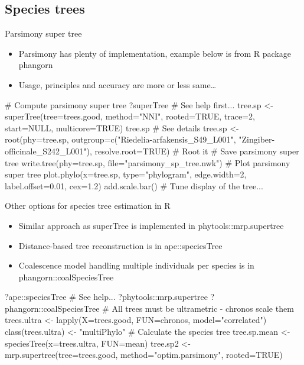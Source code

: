 \documentclass[compress, ucs, xelatex, 11pt, xcolor=x11names, aspectratio=169,
	hyperref={
		bookmarks=true,
		unicode=true,
		colorlinks=true,
		pdftitle={HybSeq course},
		plainpages=false,
		pdfauthor={Vojtech Zeisek},
		pdfsubject={Practical processing of HybSeq target enrichment sequencing data on computing grids like MetaCentrum},
		pdfcreator={XeLaTeX},
		pdfkeywords={BASH, command line, GNU, HybSeq, Linux, MetaCentrum, sequencing shell, target enrichment},
		linkcolor=Turquoise4, %
		anchorcolor=DodgerBlue4, %
		citecolor=DodgerBlue4, %
		filecolor=DodgerBlue4, %
		menucolor=Tan4, %
		urlcolor=DarkOliveGreen4, %
		pdftex},
	url={hyphens, lowtilde} %
	]{beamer}
\renewcommand{\texttt}[1]{\colorbox{Cornsilk2}{{\ttfamily #1}}}
\begin{document}
\subsection{Species trees}

\begin{frame}[fragile]{Parsimony super tree}
	\begin{itemize}
		\item Parsimony has plenty of implementation, example below is from \texttt{R} package \texttt{phangorn}
		\item Usage, principles and accuracy are more or less same\ldots
	\end{itemize}
	\begin{spluscode}
    # Compute parsimony super tree
    ?superTree # See help first...
    tree.sp <- superTree(tree=trees.good, method="NNI", rooted=TRUE,
      trace=2, start=NULL, multicore=TRUE)
    tree.sp # See details
    tree.sp <- root(phy=tree.sp, outgroup=c("Riedelia-arfakensis_S49_L001",
      "Zingiber-officinale_S242_L001"), resolve.root=TRUE) # Root it
    # Save parsimony super tree
    write.tree(phy=tree.sp, file="parsimony_sp_tree.nwk")
    # Plot parsimony super tree
    plot.phylo(x=tree.sp, type="phylogram", edge.width=2,
      label.offset=0.01, cex=1.2)
    add.scale.bar()
    # Tune display of the tree...
	\end{spluscode}
\end{frame}

\begin{frame}[fragile]{Other options for species tree estimation in R}
	\begin{itemize}
		\item Similar approach as \texttt{superTree} is implemented in \texttt{phytools::mrp.supertree}
		\item Distance-based tree reconstruction is in \texttt{ape::speciesTree}
		\item Coalescence model handling multiple individuals per species is in \texttt{phangorn::coalSpeciesTree}
	\end{itemize}
	\begin{spluscode}
    ?ape::speciesTree # See help...
    ?phytools::mrp.supertree
    ?phangorn::coalSpeciesTree
    # All trees must be ultrametric - chronos scale them
    trees.ultra <- lapply(X=trees.good, FUN=chronos, model="correlated")
    class(trees.ultra) <- "multiPhylo"
    # Calculate the species tree
    tree.sp.mean <- speciesTree(x=trees.ultra, FUN=mean)
    tree.sp2 <- mrp.supertree(tree=trees.good, method="optim.parsimony",
      rooted=TRUE)
	\end{spluscode}
\end{frame}
\end{document}
